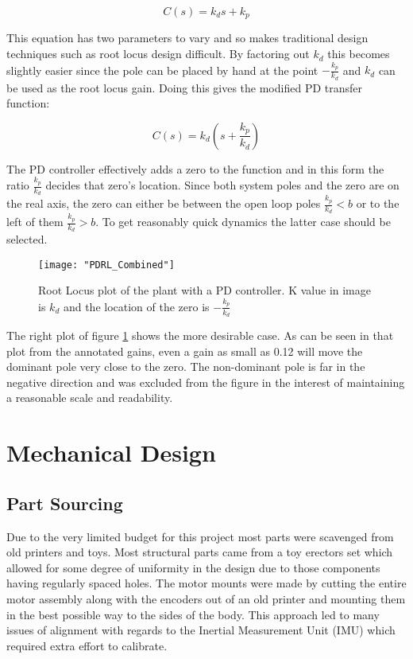 \documentclass{article}
\begin{document}
	\begin{equation}
		\label{PDController}
		C(s) = k_d s + k_p
	\end{equation}
	
	This equation has two parameters to vary and so makes traditional design techniques such as root locus design difficult. By factoring out $k_d$ this becomes slightly easier since the pole can be placed by hand at the point $-\frac{k_p}{k_d}$ and $k_d$ can be used as the root locus gain. Doing this gives the modified PD transfer function:
	
	\begin{equation}
		\label{PDModified}
		C(s) = k_d (s + \frac{k_p}{k_d})
	\end{equation}
	
	The PD controller effectively adds a zero to the function and in this form the ratio $\frac{k_p}{k_d}$ decides that zero's location. Since both system poles and the zero are on the real axis, the zero can either be between the open loop poles $\frac{k_p}{k_d} < b$ or to the left of them $\frac{k_p}{k_d} > b$. To get reasonably quick dynamics the latter case should be selected. 
	
	\begin{figure}[h]
		\centerline{\texttt{[image: "PDRL\_Combined"]}}
		\caption{Root Locus plot of the plant with a PD controller. K value in image is $k_d$ and the location of the zero is $-\frac{k_p}{k_d}$}
		\label{fig:PDRootLocus}
	\end{figure}
	
	The right plot of figure \ref{fig:PDRootLocus} shows the more desirable case. As can be seen in that plot from the annotated gains, even a gain as small as 0.12 will move the dominant pole very close to the zero. The non-dominant pole is far in the negative direction and was excluded from the figure in the interest of maintaining a reasonable scale and readability.

\section{Mechanical Design}
	\subsection{Part Sourcing}
	Due to the very limited budget for this project most parts were scavenged from old printers and toys. Most structural parts came from a toy erectors set which allowed for some degree of uniformity in the design due to those components having regularly spaced holes. The motor mounts were made by cutting the entire motor assembly along with the encoders out of an old printer and mounting them in the best possible way to the sides of the body. This approach led to many issues of alignment with regards to the Inertial Measurement Unit (IMU) which required extra effort to calibrate. 	
	
\end{document}
